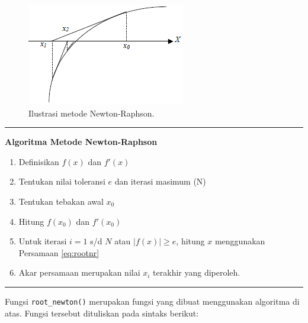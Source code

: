 \documentclass[]{book}
\providecommand{\tightlist}{%
  \setlength{\itemsep}{0pt}\setlength{\parskip}{0pt}}
\theoremstyle{definition}
\theoremstyle{definition}
\theoremstyle{definition}
\theoremstyle{remark}
\begin{document}
\begin{figure}

{\centering \includegraphics[width=0.95\linewidth]{./images/nrviz} 

}

\caption{Ilustrasi metode Newton-Raphson.}\label{fig:nrviz}
\end{figure}

\begin{center}\rule{0.5\linewidth}{\linethickness}\end{center}

\textbf{Algoritma Metode Newton-Raphson}

\begin{enumerate}
\def\labelenumi{\arabic{enumi}.}
\tightlist
\item
  Definisikan \(f\left(x \right)\) dan \(f'\left(x \right)\)
\item
  Tentukan nilai toleransi \(e\) dan iterasi masimum (N)
\item
  Tentukan tebakan awal \(x_0\)
\item
  Hitung \(f\left(x_0 \right)\) dan \(f'\left(x_0 \right)\)
\item
  Untuk iterasi \(i=1\) s/d \(N\) atau \(\left|f\left(x \right) \right|\ge e\), hitung \(x\) menggunakan Persamaan \eqref{eq:rootnr}
\item
  Akar persamaan merupakan nilai \(x_i\) terakhir yang diperoleh.
\end{enumerate}

\begin{center}\rule{0.5\linewidth}{\linethickness}\end{center}

Fungsi \texttt{root\_newton()} merupakan fungsi yang dibuat menggunakan algoritma di atas. Fungsi tersebut dituliskan pada sintaks berikut:
\end{document}
